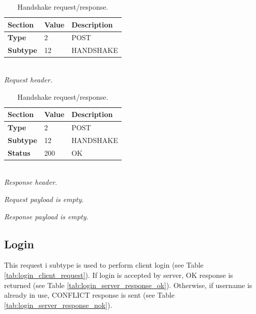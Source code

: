 \documentclass[english, sem, kiv, he, iso690alph, pdf, viewonly]{fasthesis}
\begin{document}
\begin{table}[h]
	\centering
	\begin{minipage}[b]{0.45\textwidth}
		\centering
		\begin{tabular}{|l|l|l|}
			\hline
			\textbf{Section} & \textbf{Value} & \textbf{Description} \\ \hline
			\textbf{Type} & 2 & POST \\ \hline
			\textbf{Subtype} & 12 & HANDSHAKE \\ \hline
		\end{tabular} \\
		\textit{Request header.}
	\end{minipage} 
	\hfill
	\begin{minipage}[b]{0.45\textwidth}
		\centering
		\begin{tabular}{|l|l|l|}
			\hline
			\textbf{Section} & \textbf{Value} & \textbf{Description} \\ \hline
			\textbf{Type} & 2 & POST \\ \hline
			\textbf{Subtype} & 12 & HANDSHAKE \\ \hline
			\textbf{Status} & 200 & OK \\ \hline
		\end{tabular} \\
		\textit{Response header.}
	\end{minipage} \newline

	\begin{minipage}[b]{0.45\textwidth}
		\centering
		\textit{Request payload is empty.}
	\end{minipage}	
	\hfill
	\begin{minipage}[b]{0.45\textwidth}
		\centering
		\textit{Response payload is empty.}
	\end{minipage}	
	\caption{Handshake request/response.}
	\label{tab:handshake_request_response}
\end{table}

\newpage
\subsection{Login}
This request i subtype is used to perform client login (see Table \ref{tab:login_client_request}). If login is accepted by server, OK response is returned (see Table \ref{tab:login_server_response_ok}). Otherwise, if username is already in use, CONFLICT response is sent (see Table \ref{tab:login_server_response_nok}). 
\end{document}
